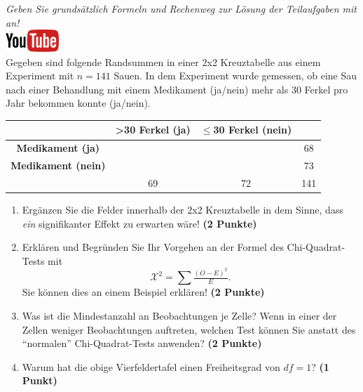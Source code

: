 \documentclass[a4paper, 9pt]{scrartcl}\usepackage[]{graphicx}\usepackage[]{xcolor}
\begin{document}
\textit{Geben Sie grunds{\"a}tzlich Formeln und Rechenweg zur L{\"o}sung der
  Teilaufgaben mit an!} \\[1Ex]

\hfill\href{https://youtu.be/jakM7fHyZfU}{\includegraphics[width =
  2cm]{img/youtube}}\\[1Ex]




Gegeben sind folgende Randsummen in einer 2x2 Kreuztabelle aus einem
Experiment mit $n = 141$ Sauen. In dem Experiment wurde gemessen,
ob eine Sau nach einer Behandlung mit einem Medikament (ja/nein)
mehr als 30 Ferkel pro Jahr bekommen konnte (ja/nein).

\vspace{5Ex}

\begin{center}
  \Large
  \begin{tabular}{c|c|c|c}
     & \textbf{>30 Ferkel (ja)} & \textbf{$\leq$30 Ferkel (nein)} &  \strut\\
    \hline
    \textbf{Medikament (ja)} & \phantom{100}  & \phantom{100}  &   68  \strut\\
    \hline
    \textbf{Medikament (nein)} & \phantom{100}  & \phantom{100}  &   73   \strut\\
    \hline
     &  69 &  72 &  141  \strut\\
  \end{tabular}
\end{center}



\vspace{5Ex}

\begin{enumerate}
\item Erg{\"a}nzen Sie die Felder innerhalb der 2x2 Kreuztabelle in dem Sinne,
  dass \textit{ein} signifikanter Effekt zu erwarten w{\"a}re!
  \textbf{(2 Punkte)}
\item Erkl{\"a}ren und Begr{\"u}nden Sie Ihr Vorgehen an der Formel des
  Chi-Quadrat-Tests mit
  \begin{equation*}
  \mathcal{X}^2 = \sum\tfrac{(O - E)^2}{E}.  
  \end{equation*}
  Sie k{\"o}nnen dies an einem Beispiel erkl{\"a}ren! \textbf{(2 Punkte)}
\item Was ist die Mindestanzahl an Beobachtungen je Zelle? Wenn in einer
  der Zellen weniger Beobachtungen auftreten, welchen Test k{\"o}nnen Sie
  anstatt des "`normalen"' Chi-Quadrat-Tests anwenden? \textbf{(2 Punkte)}
\item Warum hat die obige Vierfeldertafel einen Freiheitsgrad von $df=1$?
  \textbf{(1 Punkt)}
\end{enumerate} 
\clearpage
\end{document}
